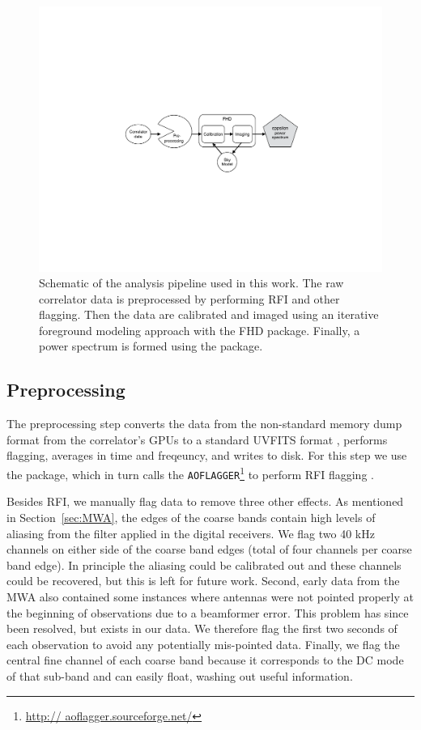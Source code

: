 \documentclass[iop]{emulateapj}
\begin{document}
\begin{figure}
\begin{center}
\includegraphics[width=\columnwidth]{pipe.pdf}
\caption[Pipeline diagram]{
Schematic of the analysis pipeline used in this work. The raw correlator data is 
preprocessed by performing RFI and other flagging. Then the data are calibrated and 
imaged using an iterative foreground modeling approach with the FHD package. Finally, a 
power spectrum is formed using the \eppsilon package.
\label{fig:pipe}
}
\end{center}
\end{figure}

\subsection{Preprocessing}\label{subsec:preprocessing}
The preprocessing step converts the data from the non-standard memory dump format 
from the correlator's GPUs to a standard UVFITS format \citep{Greisen:2012}, performs 
flagging, averages in time and freqeuncy, and writes to disk. For this step we use the 
\cotter package, which in turn calls the \texttt{AOFLAGGER}\footnote{\url{http://
aoflagger.sourceforge.net/}} to perform RFI flagging \citep{Offringa:2010}. 

Besides RFI, we manually flag data to remove three other effects. As mentioned in 
Section~\ref{sec:MWA}, the edges of the coarse bands contain high levels of aliasing from 
the filter applied in the digital receivers. We flag two 40 kHz channels on either side of the 
coarse band edges (total of four channels per coarse band edge). In principle the aliasing 
could be calibrated out and these channels could be recovered, but this is left for future 
work. Second, early data from the MWA also contained some instances where antennas 
were not pointed properly at the beginning of observations due to a beamformer error. This 
problem has since been resolved, but exists in our data. We therefore flag the first two 
seconds of each observation to avoid any potentially mis-pointed data. Finally, we flag the 
central fine channel of each coarse band because it corresponds to the DC mode of that 
sub-band and can easily float, washing out useful information.
\end{document}
